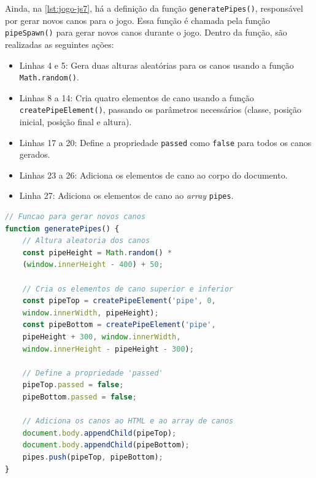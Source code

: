 Ainda, na \autoref{lst:jogo-js7}, há a definição da função \texttt{generatePipes()}, responsável por gerar novos canos para o jogo. Essa função é chamada pela função \texttt{pipeSpawn()} para gerar novos canos durante o jogo. Dentro da função, são realizadas as seguintes ações:
\begin{itemize}
    \item Linhas 4 e 5: Gera duas alturas aleatórias para os canos usando a função \texttt{Math.random()}.

    \item Linhas 8 a 14: Cria quatro elementos de cano usando a função \texttt{createPipeElement()}, passando os parâmetros necessários (classe, posição inicial, posição final e altura).

    \item Linhas 17 a 20: Define a propriedade \texttt{passed} como \texttt{false} para todos os canos gerados.

    \item Linhas 23 a 26: Adiciona os elementos de cano ao corpo do documento.

    \item Linha 27: Adiciona os elementos de cano ao \textit{array} \texttt{pipes}.
\end{itemize}



\begin{lstlisting}[language=TypeScript, caption={Projeto exemplo em JS (Parte 7): Função de geração de canos}, label=lst:jogo-js7]
// Funcao para gerar novos canos
function generatePipes() {
    // Altura aleatoria dos canos
    const pipeHeight = Math.random() * 
    (window.innerHeight - 400) + 50;

    // Cria os elementos de cano superior e inferior
    const pipeTop = createPipeElement('pipe', 0, 
    window.innerWidth, pipeHeight);
    const pipeBottom = createPipeElement('pipe',
    pipeHeight + 300, window.innerWidth,
    window.innerHeight - pipeHeight - 300);

    // Define a propriedade 'passed'
    pipeTop.passed = false;
    pipeBottom.passed = false;

    // Adiciona os canos ao HTML e ao array de canos
    document.body.appendChild(pipeTop);
    document.body.appendChild(pipeBottom);
    pipes.push(pipeTop, pipeBottom);
}
\end{lstlisting}


